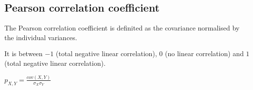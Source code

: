 
\subsection{Pearson correlation coefficient}

The Pearson correlation coefficient is definited as the covariance normalised by the individual variances.

It is between \(-1\) (total negative linear correlation), \(0\) (no linear correlation) and \(1\) (total negative linear correlation). 

\(p_{X,Y}=\frac{cov (X,Y)}{\sigma_X\sigma_Y}\)

